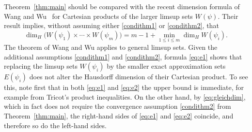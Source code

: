 \documentclass[11pt]{amsart}
\numberwithin{equation}{section}
\newcommand{\0}{\mathbf{0}}
\theoremstyle{remark}
\newcommand{\dimH}{\dim_{H}}
\begin{document}
Theorem~\ref{thm:main} should be compared with the recent dimension
formula of Wang and Wu~\cite{WangWuTAMS} for Cartesian products of the
larger limsup sets \(W(\psi)\). Their result implies, without assuming
either \eqref{condithm1} or \eqref{condithm2}, that
\begin{equation}\label{eq:e2}
\dimH\bigl(W(\psi_1)\times\cdots\times W(\psi_m)\bigr)
=
m-1+\min_{1\le i\le m}\dimH W(\psi_i).
\end{equation}
The theorem of Wang and Wu applies to general
limsup sets.
Given the additional
assumptions \eqref{condithm1} and \eqref{condithm2}, formula
\eqref{eq:e1} shows that replacing the limsup sets \(W(\psi_i)\) by the
smaller exact approximation sets \(E(\psi_i)\) does not alter the
Hausdorff dimension of their Cartesian product. To see this, note first that in both \eqref{eq:e1} and \eqref{eq:e2} the
upper bound is immediate, for example from Tricot's product inequalities. 
 On the other hand, by \eqref{eq:gleichdim},
which in fact does not require the convergence assumption \eqref{condithm2}
from Theorem~\ref{thm:main}, the right-hand sides of
\eqref{eq:e1} and \eqref{eq:e2} coincide, and therefore so do the
left-hand sides.




\end{document}

